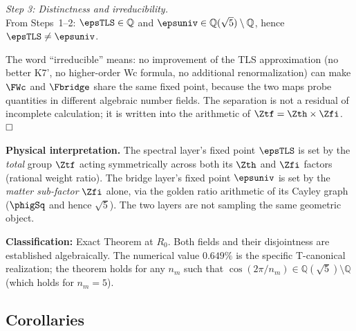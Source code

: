 \documentclass[12pt, a4paper]{article}
\begin{document}
\begin{formalbox}[title={THM-ZC71-01: Two-Layer Floor Irreducibility Theorem
  ($R_0$, Exact)}]
\textit{Step 3: Distinctness and irreducibility.}\\
From Steps~1--2:
$\epsTLS \in \mathbb{Q}$ and $\epsuniv \in \mathbb{Q}(\sqrt{5})\setminus\mathbb{Q}$,
hence $\epsTLS \neq \epsuniv$.

The word ``irreducible'' means: no improvement of the TLS
approximation (no better K7', no higher-order Wc formula,
no additional renormalization) can make $\FWc$ and $\Fbridge$
share the same fixed point, because the two maps probe
quantities in different algebraic number fields.
The separation is not a residual of incomplete calculation;
it is written into the arithmetic of $\Ztf = \Zth\times\Zfi$.
$\hfill\square$

\textbf{Physical interpretation.}
The spectral layer's fixed point $\epsTLS$ is set by the
\emph{total} group $\Ztf$ acting symmetrically across both
its $\Zth$ and $\Zfi$ factors (rational weight ratio).
The bridge layer's fixed point $\epsuniv$ is set by the
\emph{matter sub-factor} $\Zfi$ alone, via the golden ratio
arithmetic of its Cayley graph ($\phigSq$ and hence $\sqrt{5}$).
The two layers are not sampling the same geometric object.

\textbf{Classification:} Exact Theorem at $R_0$.
Both fields and their disjointness are established algebraically.
The numerical value $0.649\%$ is the specific T-canonical
realization; the theorem holds for any $n_m$ such that
$\cos(2\pi/n_m) \in \mathbb{Q}(\sqrt{5})\setminus\mathbb{Q}$
(which holds for $n_m = 5$).
\end{formalbox}

\subsection{Corollaries}
\label{sec:cors}

\end{document}
